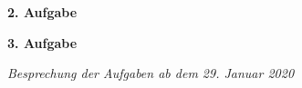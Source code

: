 \documentclass[a4paper,11pt]{scrreprt} %
\theoremstyle{definition} %
\begin{document}
\textbf{2. Aufgabe}
 


 \vspace{3ex}

\textbf{3. Aufgabe}




\vspace*{\fill} %

\begin{flushright}
\textit{ Besprechung der Aufgaben ab dem 29. Januar 2020 }
\end{flushright}
\end{document}
